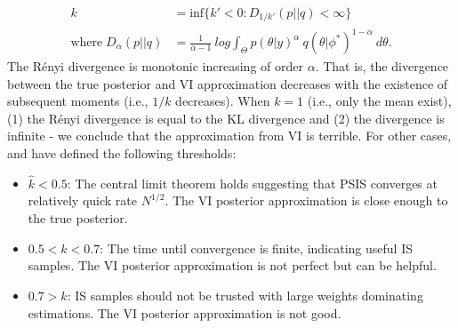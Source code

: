 \documentclass[twoside]{article}
\begin{document}
\begin{align}
    k &= \text{inf}\bigg\{k' < 0: D_{1/k'}(p || q) < \infty\bigg\} \\
    \text{where} \; D_{\alpha}(p || q) &= \frac{1}{\alpha - 1} \: log \int_{\Theta} p(\theta| y)^{\alpha} \: q(\theta | \phi^*)^{1 - \alpha} \: d \theta.
\end{align}
The Rényi divergence is monotonic increasing of order $\alpha$. That is, the divergence between the true posterior and VI approximation decreases with the existence of subsequent moments (i.e., $1/k$ decreases). When $k = 1$ (i.e., only the mean exist), (1) the Rényi divergence is equal to the KL divergence and (2) the divergence is infinite - we conclude that the approximation from VI is terrible. For other cases, \citet{Vehtari:2017aa} and \citet{2018arXiv180202538Y} have defined the following thresholds: 
\begin{itemize}
    \item $\hat{k} < 0.5$: The central limit theorem holds suggesting that PSIS converges at relatively quick rate $N^{1/2}$. The VI posterior approximation is close enough to the true posterior.
    \item $0.5 < \hat{k} < 0.7$: The time until convergence is finite, indicating useful IS samples. The VI posterior approximation is not perfect but can be helpful.
    \item $0.7 > \hat{k}$: IS samples should not be trusted with large weights dominating estimations. The VI posterior approximation is not good.
\end{itemize}
\end{document}
